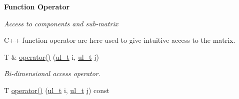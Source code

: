 \begin{Indent}\textbf{ Function Operator}\par
{\em Access to components and sub-\/matrix

C++ function operator are here used to give intuitive access to the matrix. }\begin{DoxyCompactItemize}
\item 
T \& \mbox{\hyperlink{class_n_p_matrix_a437ba12a96e979b50f6d579400b20f6f}{operator()}} (\mbox{\hyperlink{typedef_8h_a1b140a2034db3f5dfe18a987745df43a}{ul\+\_\+t}} i, \mbox{\hyperlink{typedef_8h_a1b140a2034db3f5dfe18a987745df43a}{ul\+\_\+t}} j)
\begin{DoxyCompactList}\small\item\em Bi-\/dimensional access operator. \end{DoxyCompactList}\item 
T \mbox{\hyperlink{class_n_p_matrix_aa512abe782fac9e6b0d2eb1167df4133}{operator()}} (\mbox{\hyperlink{typedef_8h_a1b140a2034db3f5dfe18a987745df43a}{ul\+\_\+t}} i, \mbox{\hyperlink{typedef_8h_a1b140a2034db3f5dfe18a987745df43a}{ul\+\_\+t}} j) const
\end{DoxyCompactItemize}
\end{Indent}
